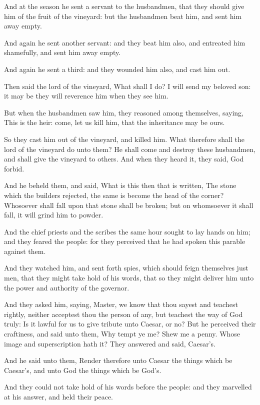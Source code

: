 \Verse And at the season he sent a servant to the husbandmen, that they should give him of the fruit of the vineyard: but the husbandmen beat him, and sent him away empty.

\Verse And again he sent another servant: and they beat him also, and entreated him shamefully, and sent him away empty.

\Verse And again he sent a third: and they wounded him also, and cast him out.

\Verse Then said the lord of the vineyard, What shall I do? I will send my beloved son: it may be they will reverence him when they see him.

\Verse But when the husbandmen saw him, they reasoned among themselves, saying, This is the heir: come, let us kill him, that the inheritance may be ours.

\Verse So they cast him out of the vineyard, and killed him. What therefore shall the lord of the vineyard do unto them?  \Verse He shall come and destroy these husbandmen, and shall give the vineyard to others. And when they heard it, they said, God forbid.

\Verse And he beheld them, and said, What is this then that is written, The stone which the builders rejected, the same is become the head of the corner?  \Verse Whosoever shall fall upon that stone shall be broken; but on whomsoever it shall fall, it will grind him to powder.

\Verse And the chief priests and the scribes the same hour sought to lay hands on him; and they feared the people: for they perceived that he had spoken this parable against them.

\Verse And they watched him, and sent forth spies, which should feign themselves just men, that they might take hold of his words, that so they might deliver him unto the power and authority of the governor.

\Verse And they asked him, saying, Master, we know that thou sayest and teachest rightly, neither acceptest thou the person of any, but teachest the way of God truly: \Verse Is it lawful for us to give tribute unto Caesar, or no?  \Verse But he perceived their craftiness, and said unto them, Why tempt ye me?  \Verse Shew me a penny. Whose image and superscription hath it? They answered and said, Caesar's.

\Verse And he said unto them, Render therefore unto Caesar the things which be Caesar's, and unto God the things which be God's.

\Verse And they could not take hold of his words before the people: and they marvelled at his answer, and held their peace.

